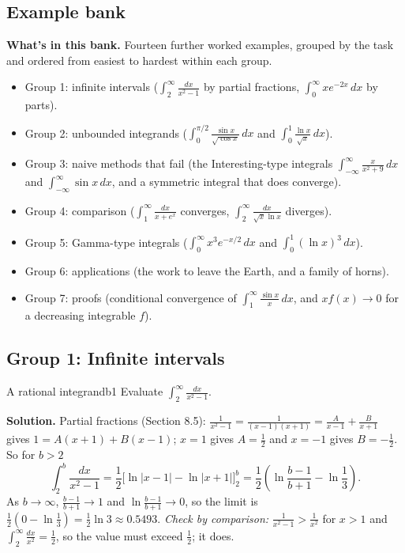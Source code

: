\documentclass[11pt]{article}
\begin{document}
\subsection*{Example bank}

\textbf{What's in this bank.} Fourteen further worked examples, grouped by the task and ordered from easiest to hardest within each group.
\begin{itemize}[nosep]
  \item Group 1: infinite intervals ($\int_2^\infty\frac{dx}{x^2-1}$ by partial fractions, $\int_0^\infty xe^{-2x}\,dx$ by parts).
  \item Group 2: unbounded integrands ($\int_0^{\pi/2}\frac{\sin x}{\sqrt{\cos x}}\,dx$ and $\int_0^1\frac{\ln x}{\sqrt x}\,dx$).
  \item Group 3: naive methods that fail (the Interesting-type integrals $\int_{-\infty}^\infty\frac x{x^2+9}\,dx$ and $\int_{-\infty}^\infty\sin x\,dx$, and a symmetric integral that does converge).
  \item Group 4: comparison ($\int_1^\infty\frac{dx}{x+e^x}$ converges, $\int_2^\infty\frac{dx}{\sqrt x\ln x}$ diverges).
  \item Group 5: Gamma-type integrals ($\int_0^\infty x^3e^{-x/2}\,dx$ and $\int_0^1(\ln x)^3\,dx$).
  \item Group 6: applications (the work to leave the Earth, and a family of horns).
  \item Group 7: proofs (conditional convergence of $\int_1^\infty\frac{\sin x}x\,dx$, and $xf(x)\to0$ for a decreasing integrable $f$).
\end{itemize}

\subsection*{Group 1: Infinite intervals}

\begin{exmp}{A rational integrand}{b1}
Evaluate $\displaystyle\int_2^\infty\frac{dx}{x^2-1}$.

\textbf{Solution.} Partial fractions (Section 8.5): $\frac1{x^2-1}=\frac1{(x-1)(x+1)}=\frac A{x-1}+\frac B{x+1}$ gives $1=A(x+1)+B(x-1)$; $x=1$ gives $A=\frac12$ and $x=-1$ gives $B=-\frac12$. So for $b>2$
\[\int_2^b\frac{dx}{x^2-1}=\frac12\Big[\ln\lvert x-1\rvert-\ln\lvert x+1\rvert\Big]_2^b=\frac12\left(\ln\frac{b-1}{b+1}-\ln\frac13\right).\]
As $b\to\infty$, $\frac{b-1}{b+1}\to1$ and $\ln\frac{b-1}{b+1}\to0$, so the limit is $\frac12\left(0-\ln\frac13\right)=\frac12\ln3\approx0.5493$.
\emph{Check by comparison:} $\frac1{x^2-1}>\frac1{x^2}$ for $x>1$ and $\int_2^\infty\frac{dx}{x^2}=\frac12$, so the value must exceed $\frac12$; it does.
\end{exmp}
\end{document}
